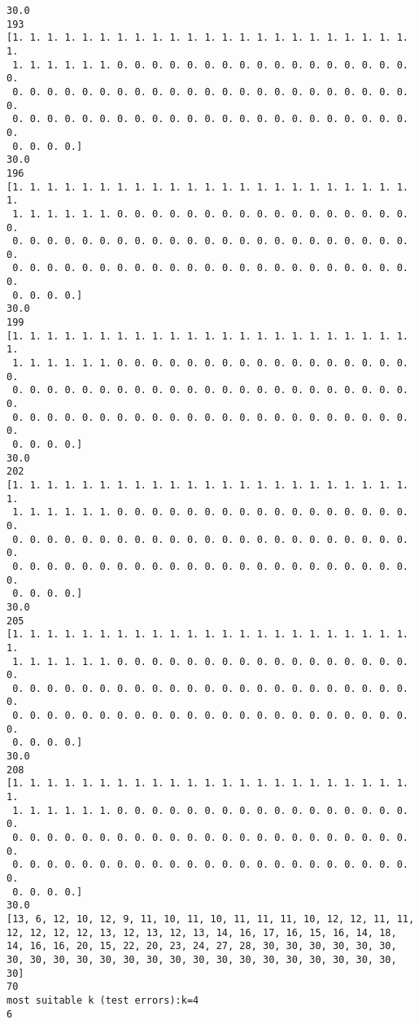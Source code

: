 \documentclass[11pt]{article}
\begin{document}
\begin{Verbatim}[commandchars=\\\{\}]
30.0
193
[1. 1. 1. 1. 1. 1. 1. 1. 1. 1. 1. 1. 1. 1. 1. 1. 1. 1. 1. 1. 1. 1. 1. 1.
 1. 1. 1. 1. 1. 1. 0. 0. 0. 0. 0. 0. 0. 0. 0. 0. 0. 0. 0. 0. 0. 0. 0. 0.
 0. 0. 0. 0. 0. 0. 0. 0. 0. 0. 0. 0. 0. 0. 0. 0. 0. 0. 0. 0. 0. 0. 0. 0.
 0. 0. 0. 0. 0. 0. 0. 0. 0. 0. 0. 0. 0. 0. 0. 0. 0. 0. 0. 0. 0. 0. 0. 0.
 0. 0. 0. 0.]
30.0
196
[1. 1. 1. 1. 1. 1. 1. 1. 1. 1. 1. 1. 1. 1. 1. 1. 1. 1. 1. 1. 1. 1. 1. 1.
 1. 1. 1. 1. 1. 1. 0. 0. 0. 0. 0. 0. 0. 0. 0. 0. 0. 0. 0. 0. 0. 0. 0. 0.
 0. 0. 0. 0. 0. 0. 0. 0. 0. 0. 0. 0. 0. 0. 0. 0. 0. 0. 0. 0. 0. 0. 0. 0.
 0. 0. 0. 0. 0. 0. 0. 0. 0. 0. 0. 0. 0. 0. 0. 0. 0. 0. 0. 0. 0. 0. 0. 0.
 0. 0. 0. 0.]
30.0
199
[1. 1. 1. 1. 1. 1. 1. 1. 1. 1. 1. 1. 1. 1. 1. 1. 1. 1. 1. 1. 1. 1. 1. 1.
 1. 1. 1. 1. 1. 1. 0. 0. 0. 0. 0. 0. 0. 0. 0. 0. 0. 0. 0. 0. 0. 0. 0. 0.
 0. 0. 0. 0. 0. 0. 0. 0. 0. 0. 0. 0. 0. 0. 0. 0. 0. 0. 0. 0. 0. 0. 0. 0.
 0. 0. 0. 0. 0. 0. 0. 0. 0. 0. 0. 0. 0. 0. 0. 0. 0. 0. 0. 0. 0. 0. 0. 0.
 0. 0. 0. 0.]
30.0
202
[1. 1. 1. 1. 1. 1. 1. 1. 1. 1. 1. 1. 1. 1. 1. 1. 1. 1. 1. 1. 1. 1. 1. 1.
 1. 1. 1. 1. 1. 1. 0. 0. 0. 0. 0. 0. 0. 0. 0. 0. 0. 0. 0. 0. 0. 0. 0. 0.
 0. 0. 0. 0. 0. 0. 0. 0. 0. 0. 0. 0. 0. 0. 0. 0. 0. 0. 0. 0. 0. 0. 0. 0.
 0. 0. 0. 0. 0. 0. 0. 0. 0. 0. 0. 0. 0. 0. 0. 0. 0. 0. 0. 0. 0. 0. 0. 0.
 0. 0. 0. 0.]
30.0
205
[1. 1. 1. 1. 1. 1. 1. 1. 1. 1. 1. 1. 1. 1. 1. 1. 1. 1. 1. 1. 1. 1. 1. 1.
 1. 1. 1. 1. 1. 1. 0. 0. 0. 0. 0. 0. 0. 0. 0. 0. 0. 0. 0. 0. 0. 0. 0. 0.
 0. 0. 0. 0. 0. 0. 0. 0. 0. 0. 0. 0. 0. 0. 0. 0. 0. 0. 0. 0. 0. 0. 0. 0.
 0. 0. 0. 0. 0. 0. 0. 0. 0. 0. 0. 0. 0. 0. 0. 0. 0. 0. 0. 0. 0. 0. 0. 0.
 0. 0. 0. 0.]
30.0
208
[1. 1. 1. 1. 1. 1. 1. 1. 1. 1. 1. 1. 1. 1. 1. 1. 1. 1. 1. 1. 1. 1. 1. 1.
 1. 1. 1. 1. 1. 1. 0. 0. 0. 0. 0. 0. 0. 0. 0. 0. 0. 0. 0. 0. 0. 0. 0. 0.
 0. 0. 0. 0. 0. 0. 0. 0. 0. 0. 0. 0. 0. 0. 0. 0. 0. 0. 0. 0. 0. 0. 0. 0.
 0. 0. 0. 0. 0. 0. 0. 0. 0. 0. 0. 0. 0. 0. 0. 0. 0. 0. 0. 0. 0. 0. 0. 0.
 0. 0. 0. 0.]
30.0
[13, 6, 12, 10, 12, 9, 11, 10, 11, 10, 11, 11, 11, 10, 12, 12, 11, 11, 12, 12, 12, 12, 13, 12, 13, 12, 13, 14, 16, 17, 16, 15, 16, 14, 18, 14, 16, 16, 20, 15, 22, 20, 23, 24, 27, 28, 30, 30, 30, 30, 30, 30, 30, 30, 30, 30, 30, 30, 30, 30, 30, 30, 30, 30, 30, 30, 30, 30, 30, 30]
70
most suitable k (test errors):k=4
6

    \end{Verbatim}
\end{document}
